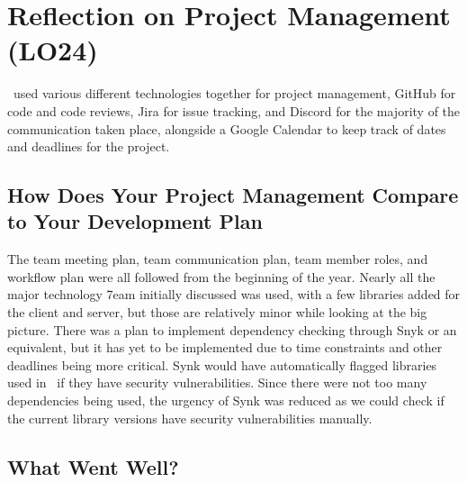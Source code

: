 \documentclass{article}
\begin{document}
\section{Reflection on Project Management (LO24)}


\noindent \progname ~used various different technologies together for project management, GitHub for code and code reviews, Jira for issue tracking, and Discord for the majority of the communication taken place, alongside a Google Calendar to keep track of dates and deadlines for the project.

\subsection{How Does Your Project Management Compare to Your Development Plan}


\noindent The team meeting plan, team communication plan, team member roles, and workflow plan were all followed from the beginning of the year. Nearly all the major technology 7eam initially discussed was used, with a few libraries added for the client and server, but those are relatively minor while looking at the big picture. There was a plan to implement dependency checking through Snyk or an equivalent, but it has yet to be implemented due to time constraints and other deadlines being more critical. Synk would have automatically flagged libraries used in \progname ~if they have security vulnerabilities. Since there were not too many dependencies being used, the urgency of Synk was reduced as we could check if the current library versions have security vulnerabilities manually.

\subsection{What Went Well?}

\end{document}
